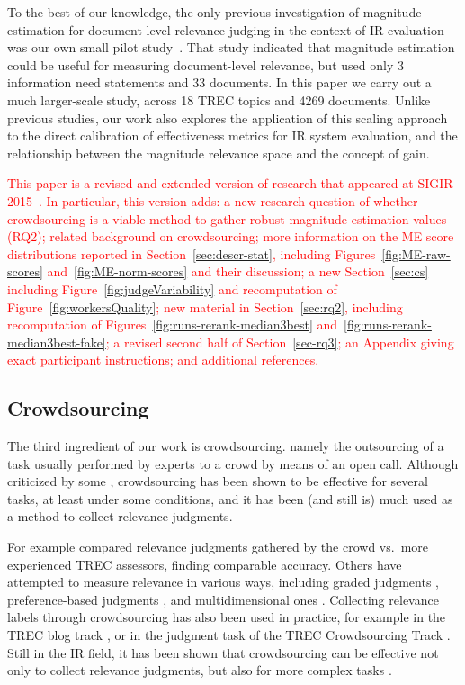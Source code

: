 To the best of our knowledge, the only previous investigation of
magnitude estimation for document-level relevance judging in the
context of IR evaluation was our own small pilot study~\cite{SchMad14,MadMiz15}.
That study indicated that 
magnitude estimation could be useful for
measuring document-level relevance, but used only 
3 information need statements and 33 documents.
In this paper we carry out a much larger-scale study, across 18 TREC
topics and 4269 documents.
Unlike previous studies, 
our work also explores the application of this scaling approach to the
direct calibration of effectiveness metrics for IR system evaluation,
and the relationship between the magnitude relevance space and the
concept of gain.

\textcolor{red}{ This paper is a revised and extended version of
research that appeared at SIGIR 2015~\cite{ME-SIGIR15}.
In particular, this version adds: a new research question of whether
crowdsourcing is a viable method to gather robust magnitude estimation
values (RQ2); related background on crowdsourcing; more information on
the ME score distributions reported in Section~\ref{sec:descr-stat},
including Figures~\ref{fig:ME-raw-scores} and~\ref{fig:ME-norm-scores}
and their discussion; a new Section~\ref{sec:cs} including
Figure~\ref{fig:judgeVariability} and recomputation of
Figure~\ref{fig:workersQuality}; new material in Section~\ref{sec:rq2},
including recomputation of Figures~\ref{fig:runs-rerank-median3best}
and~\ref{fig:runs-rerank-median3best-fake}; a revised second half of
Section~\ref{sec-rq3}; an Appendix giving exact participant
instructions; and additional references.
} 


\subsection{Crowdsourcing}
\label{sec:crowdsourcing}

The third ingredient of our work is crowdsourcing. 
namely the outsourcing of a task usually performed by experts to a
crowd by means of an open call. 
Although criticized by some \cite{keen2008}, crowdsourcing has been
shown to be effective for several tasks, at least under some
conditions, and
it has been (and still is) much used as a method to collect relevance
judgments. 

For example \citet{Alonso:2012} compared relevance judgments gathered
by the crowd vs.\ more experienced TREC assessors, finding comparable
accuracy. 
Others have attempted to measure relevance in various ways, including
graded judgments \cite{mccreadie:2011}, preference-based judgments
\cite{Anderton2012}, and multidimensional ones \cite{Zhang2014}.
Collecting relevance labels through crowdsourcing has also been used
in practice, for example in the TREC blog track \cite{mccreadie:2011},
or in the judgment task of the TREC Crowdsourcing Track
\cite{Smucker2014}. 
Still in the IR field, it has been shown that crowdsourcing can be
effective not only to collect relevance judgments, but also for more
complex tasks \cite{Zuccon:2013}.


